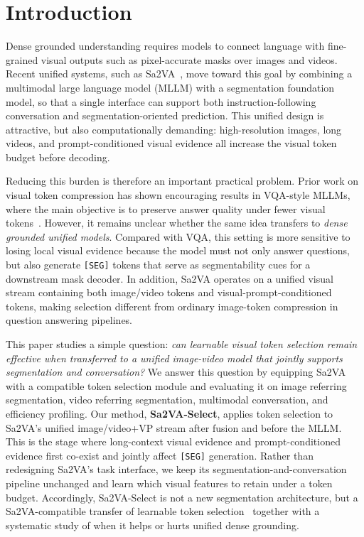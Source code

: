 \section{Introduction}
\label{sec:intro}

Dense grounded understanding requires models to connect language with fine-grained visual outputs such as pixel-accurate masks over images and videos.
Recent unified systems, such as Sa2VA~\cite{yuan2025sa2va}, move toward this goal by combining a multimodal large language model (MLLM) with a segmentation foundation model, so that a single interface can support both instruction-following conversation and segmentation-oriented prediction.
This unified design is attractive, but also computationally demanding: high-resolution images, long videos, and prompt-conditioned visual evidence all increase the visual token budget before decoding.

Reducing this burden is therefore an important practical problem.
Prior work on visual token compression has shown encouraging results in VQA-style MLLMs, where the main objective is to preserve answer quality under fewer visual tokens~\cite{zhu2025visionselector,yang2024visionzip,zhang2024sparsevlm,zhu2024focusllava,yao2024deco,yang2025topv}.
However, it remains unclear whether the same idea transfers to \emph{dense grounded unified models}.
Compared with VQA, this setting is more sensitive to losing local visual evidence because the model must not only answer questions, but also generate \texttt{[SEG]} tokens that serve as segmentability cues for a downstream mask decoder.
In addition, Sa2VA operates on a unified visual stream containing both image/video tokens and visual-prompt-conditioned tokens, making selection different from ordinary image-token compression in question answering pipelines.

This paper studies a simple question: \emph{can learnable visual token selection remain effective when transferred to a unified image-video model that jointly supports segmentation and conversation?}
We answer this question by equipping Sa2VA with a compatible token selection module and evaluating it on image referring segmentation, video referring segmentation, multimodal conversation, and efficiency profiling.
Our method, \textbf{Sa2VA-Select}, applies token selection to Sa2VA's unified image/video+VP stream after fusion and before the MLLM.
This is the stage where long-context visual evidence and prompt-conditioned evidence first co-exist and jointly affect \texttt{[SEG]} generation.
Rather than redesigning Sa2VA's task interface, we keep its segmentation-and-conversation pipeline unchanged and learn which visual features to retain under a token budget.
Accordingly, Sa2VA-Select is not a new segmentation architecture, but a Sa2VA-compatible transfer of learnable token selection~\cite{zhu2025visionselector} together with a systematic study of when it helps or hurts unified dense grounding.

